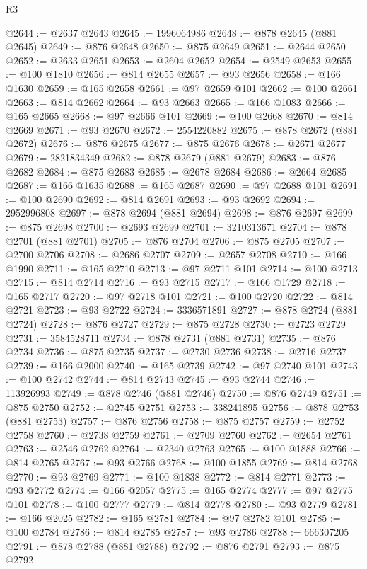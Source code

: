 \begin{lexlean}{R3}
\begin{coremodule}
@2644 := @2637 @2643
@2645 := 1996064986
@2648 := @878 @2645 (@881 @2645)
@2649 := @876 @2648
@2650 := @875 @2649
@2651 := @2644 @2650
@2652 := @2633 @2651
@2653 := @2604 @2652
@2654 := @2549 @2653
@2655 := @100 @1810
@2656 := @814 @2655
@2657 := @93 @2656
@2658 := @166 @1630
@2659 := @165 @2658
@2661 := @97 @2659 @101
@2662 := @100 @2661
@2663 := @814 @2662
@2664 := @93 @2663
@2665 := @166 @1083
@2666 := @165 @2665
@2668 := @97 @2666 @101
@2669 := @100 @2668
@2670 := @814 @2669
@2671 := @93 @2670
@2672 := 2554220882
@2675 := @878 @2672 (@881 @2672)
@2676 := @876 @2675
@2677 := @875 @2676
@2678 := @2671 @2677
@2679 := 2821834349
@2682 := @878 @2679 (@881 @2679)
@2683 := @876 @2682
@2684 := @875 @2683
@2685 := @2678 @2684
@2686 := @2664 @2685
@2687 := @166 @1635
@2688 := @165 @2687
@2690 := @97 @2688 @101
@2691 := @100 @2690
@2692 := @814 @2691
@2693 := @93 @2692
@2694 := 2952996808
@2697 := @878 @2694 (@881 @2694)
@2698 := @876 @2697
@2699 := @875 @2698
@2700 := @2693 @2699
@2701 := 3210313671
@2704 := @878 @2701 (@881 @2701)
@2705 := @876 @2704
@2706 := @875 @2705
@2707 := @2700 @2706
@2708 := @2686 @2707
@2709 := @2657 @2708
@2710 := @166 @1990
@2711 := @165 @2710
@2713 := @97 @2711 @101
@2714 := @100 @2713
@2715 := @814 @2714
@2716 := @93 @2715
@2717 := @166 @1729
@2718 := @165 @2717
@2720 := @97 @2718 @101
@2721 := @100 @2720
@2722 := @814 @2721
@2723 := @93 @2722
@2724 := 3336571891
@2727 := @878 @2724 (@881 @2724)
@2728 := @876 @2727
@2729 := @875 @2728
@2730 := @2723 @2729
@2731 := 3584528711
@2734 := @878 @2731 (@881 @2731)
@2735 := @876 @2734
@2736 := @875 @2735
@2737 := @2730 @2736
@2738 := @2716 @2737
@2739 := @166 @2000
@2740 := @165 @2739
@2742 := @97 @2740 @101
@2743 := @100 @2742
@2744 := @814 @2743
@2745 := @93 @2744
@2746 := 113926993
@2749 := @878 @2746 (@881 @2746)
@2750 := @876 @2749
@2751 := @875 @2750
@2752 := @2745 @2751
@2753 := 338241895
@2756 := @878 @2753 (@881 @2753)
@2757 := @876 @2756
@2758 := @875 @2757
@2759 := @2752 @2758
@2760 := @2738 @2759
@2761 := @2709 @2760
@2762 := @2654 @2761
@2763 := @2546 @2762
@2764 := @2340 @2763
@2765 := @100 @1888
@2766 := @814 @2765
@2767 := @93 @2766
@2768 := @100 @1855
@2769 := @814 @2768
@2770 := @93 @2769
@2771 := @100 @1838
@2772 := @814 @2771
@2773 := @93 @2772
@2774 := @166 @2057
@2775 := @165 @2774
@2777 := @97 @2775 @101
@2778 := @100 @2777
@2779 := @814 @2778
@2780 := @93 @2779
@2781 := @166 @2025
@2782 := @165 @2781
@2784 := @97 @2782 @101
@2785 := @100 @2784
@2786 := @814 @2785
@2787 := @93 @2786
@2788 := 666307205
@2791 := @878 @2788 (@881 @2788)
@2792 := @876 @2791
@2793 := @875 @2792

\end{coremodule}
\end{lexlean}
